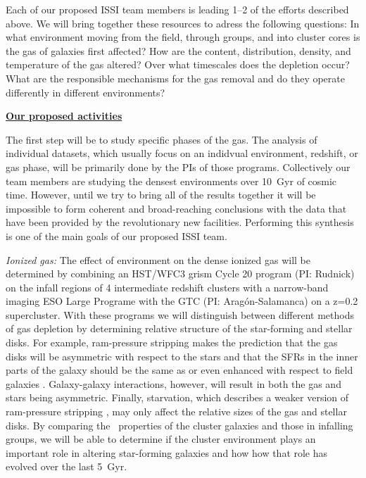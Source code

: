 \documentclass[11pt]{article}
\begin{document}
Each of our proposed ISSI team members is leading 1--2 of the efforts
described above.  We will bring together these resources to
adress the following questions: In what environment moving from the
field, through groups, and into cluster cores is the gas of galaxies
first affected?  How are the content, distribution, density,
and temperature of the gas altered?  Over what timescales does the
depletion occur?  What are the responsible mechanisms for the gas
removal and do they operate differently in different environments?

\centerline{{\bf \underline{ Our proposed activities}}}
\medskip

The first step will be to study specific phases of the gas.  The
analysis of individual datasets, which usually focus on an indidvual
environment, redshift, or gas phase, will be primarily done by the PIs
of those programs.  Collectively our team members are studying the
densest environments over 10~Gyr of cosmic time.  However, until we
try to bring all of the results together it will be impossible to form
coherent and broad-reaching conclusions with the data that have been
provided by the revolutionary new facilities.  Performing this
synthesis is one of the main goals of our proposed ISSI team.

\textit{Ionized gas:} The effect of environment on the dense ionized
gas will be determined by combining an HST/WFC3 grism Cycle 20 program
(PI: Rudnick) on the infall regions of 4 intermediate redshift
clusters with a narrow-band imaging ESO Large Programe with the GTC
(PI: Arag\'on-Salamanca) on a z=0.2 supercluster.  With these programs
we will distinguish between different methods of gas depletion by
determining relative structure of the star-forming and stellar disks.
For example, ram-pressure stripping makes the prediction that the gas
disks will be asymmetric \citep[e.g.][]{Quilis00,Crowl05} with respect
to the stars and that the SFRs in the inner parts of the galaxy should
be the same as or even enhanced with respect to field galaxies
\citep{Koopmann04,Weinmann10}.  Galaxy-galaxy interactions, however,
will result in both the gas and stars being asymmetric.  Finally,
starvation, which describes a weaker version of ram-pressure stripping
\citep[e.g.][]{Larson80}, may only affect the relative sizes of the
gas and stellar disks.  By comparing the \ha\ properties of the
cluster galaxies and those in infalling groups, we will be able to
determine if the cluster environment plays an important role in
altering star-forming galaxies and how how that role has evolved over
the last 5~Gyr.
\end{document}
